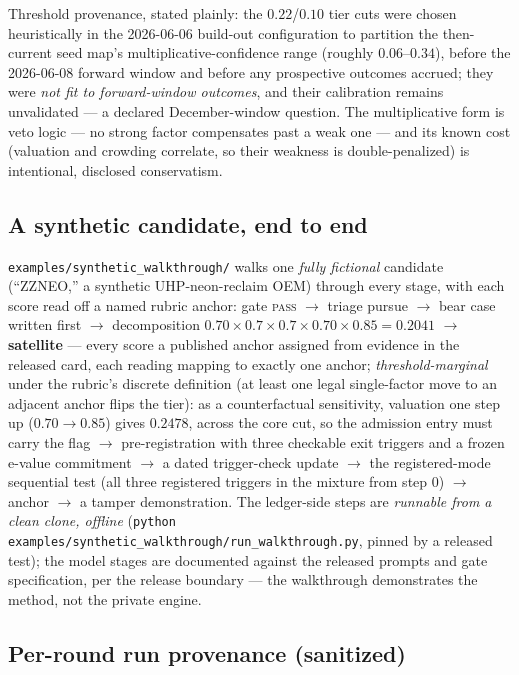 \documentclass[11pt]{article}
\begin{document}
Threshold provenance, stated plainly: the $0.22$/$0.10$ tier cuts were chosen heuristically in
the 2026-06-06 build-out configuration to partition the then-current seed map's
multiplicative-confidence range (roughly $0.06$--$0.34$), before the 2026-06-08 forward window
and before any prospective outcomes accrued; they were \emph{not fit to forward-window outcomes},
and their calibration remains unvalidated --- a declared December-window question. The
multiplicative form is veto logic --- no strong factor compensates past a weak one --- and its known
cost (valuation and crowding correlate, so their weakness is double-penalized) is intentional,
disclosed conservatism.

\subsection*{A synthetic candidate, end to end}

\texttt{examples/synthetic\_walkthrough/} walks one \emph{fully fictional} candidate
(``ZZNEO,'' a synthetic UHP-neon-reclaim OEM) through every stage, with each score read off a
named rubric anchor: gate \textsc{pass} $\to$ triage pursue $\to$ bear case written first $\to$
decomposition $0.70 \times 0.7 \times 0.7 \times 0.70 \times 0.85 = 0.2041$ $\to$
\textbf{satellite} --- every score a published anchor assigned from evidence in the released
card, each reading mapping to exactly one anchor;
\emph{threshold-marginal} under the rubric's discrete definition (at least one legal
single-factor move to an adjacent anchor flips the tier): as a counterfactual sensitivity,
valuation one step up ($0.70 \to 0.85$) gives $0.2478$, across the core cut, so the admission
entry must carry the flag $\to$ pre-registration with three checkable exit triggers and a frozen e-value
commitment $\to$ a dated trigger-check update $\to$ the registered-mode sequential test (all three
registered triggers in the mixture from step 0) $\to$ anchor $\to$ a tamper demonstration.
The ledger-side steps are \emph{runnable from a clean clone, offline}
(\texttt{python examples/synthetic\_walkthrough/run\_walkthrough.py}, pinned by a released test);
the model stages are documented against the released prompts and gate specification, per the
release boundary --- the walkthrough demonstrates the method, not the private engine.

\subsection*{Per-round run provenance (sanitized)}
\end{document}
